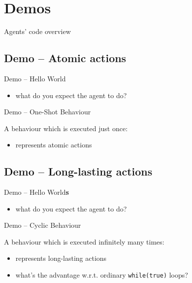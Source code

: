 \documentclass{beamer}\mode<presentation>{\usetheme{AMSCesenaPurpleAndGold}}
\begin{document}
\section{Demos}

\begin{frame}{Agents' code overview}
	
\end{frame}

\startDemo

\subsection{Demo \currentDemo{} -- Atomic actions}

\begin{frame}{Demo \currentDemo{} -- Hello World}
	
	\begin{itemize}
		\item what do you expect the agent to do?
	\end{itemize}
\end{frame}

\begin{frame}{Demo \currentDemo{} -- One-Shot Behaviour}

	A behaviour which is executed just once:
	\vfill
	
	\begin{itemize}
		\item represents \alert{atomic} actions
	\end{itemize}
\end{frame}

\startDemo

\subsection{Demo \currentDemo{} -- Long-lasting actions}

\begin{frame}{Demo \currentDemo{} -- Hello World\textbf{s}}
	
	\begin{itemize}
		\item what do you expect the agent to do?
	\end{itemize}
\end{frame}

\begin{frame}{Demo \currentDemo{} -- Cyclic Behaviour}

	A behaviour which is executed infinitely many times:
	\vfill
	
	\begin{itemize}
		\item represents \alert{long-lasting} actions
		\item what's the advantage w.r.t. ordinary \texttt{while(true)} loops?
	\end{itemize}
\end{frame}
\end{document}
